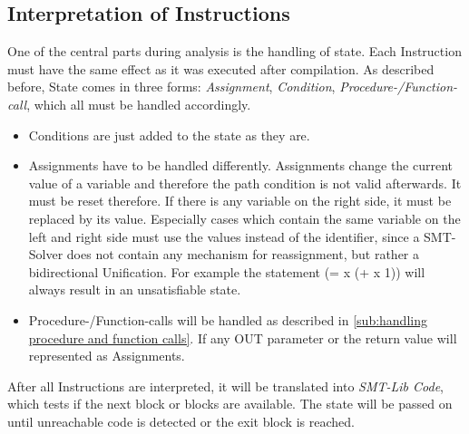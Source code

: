 \subsection{Interpretation of Instructions}
\label{sub:Interpretation of Instructions}
One of the central parts during analysis is the handling of state. Each Instruction must have the same effect as it was executed after compilation. 
As described before, State comes in three forms: \emph{Assignment}, \emph{Condition}, \emph{Procedure-/Function-call}, which all must be handled accordingly. 

\begin{itemize}
	\item Conditions are just added to the state as they are. 
	\item Assignments have to be handled differently. Assignments change the current value of a variable and therefore the path condition is not valid afterwards. It must be reset therefore. 
		If there is any variable on the right side, it must be replaced by its value. Especially cases which contain the same variable on the left and right side must use the values instead of the identifier, since a SMT-Solver does not contain any mechanism for reassignment, but rather a bidirectional Unification. For example the statement (= x (+ x 1)) will always result in an unsatisfiable state.
	\item Procedure-/Function-calls will be handled as described in \ref{sub:handling procedure and function calls}. If any OUT parameter or the return value will represented as Assignments. 
\end{itemize}

After all Instructions are interpreted, it will be translated into \emph{SMT-Lib Code}, which tests if the next block or blocks are available. 
The state will be passed on until unreachable code is detected or the exit block is reached.

